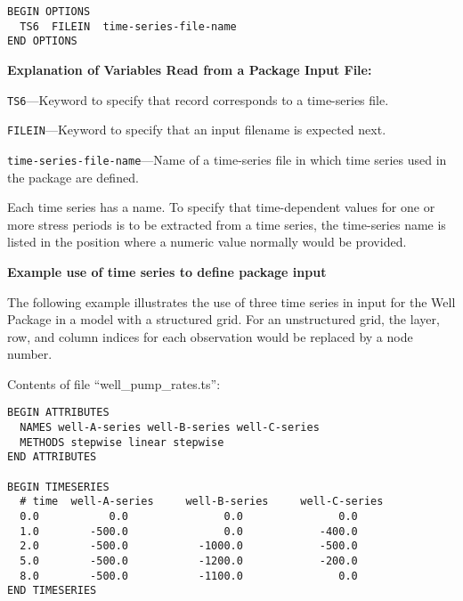 \begin{lstlisting}[style=blockdefinition]
BEGIN OPTIONS
  TS6  FILEIN  time-series-file-name
END OPTIONS
\end{lstlisting}

\noindent \textbf{Explanation of Variables Read from a Package Input File:}

\begin{description}
\item \texttt{TS6}---Keyword to specify that record corresponds to a time-series file.
\item \texttt{FILEIN}---Keyword to specify that an input filename is expected next.
\item \texttt{time-series-file-name}---Name of a time-series file in which time series used in the package are defined.
\end{description}

Each time series has a name. To specify that time-dependent values for one or more stress periods is to be extracted from a time series, the time-series name is listed in the position where a numeric value normally would be provided.

\vspace{5 mm}

\noindent \textbf{Example use of time series to define package input}

The following example illustrates the use of three time series in input for the Well Package in a model with a structured grid. For an unstructured grid, the layer, row, and column indices for each observation would be replaced by a node number.

\vspace{5 mm}

Contents of file ``well\_pump\_rates.ts'':
\begin{lstlisting}[style=inputfile]
BEGIN ATTRIBUTES
  NAMES well-A-series well-B-series well-C-series
  METHODS stepwise linear stepwise
END ATTRIBUTES

BEGIN TIMESERIES
  # time  well-A-series     well-B-series     well-C-series
  0.0           0.0               0.0               0.0
  1.0        -500.0               0.0            -400.0
  2.0        -500.0           -1000.0            -500.0
  5.0        -500.0           -1200.0            -200.0
  8.0        -500.0           -1100.0               0.0
END TIMESERIES
\end{lstlisting}

